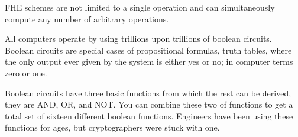 FHE schemes are not limited to a single operation and can simultaneously compute any number of arbitrary operations. 


All computers operate by using trillions upon trillions of boolean circuits. Boolean circuits are special cases of propositional formulas, truth tables, where the only output ever given by the system is either yes or no; in computer terms zero or one. 

Boolean circuits have three basic functions from which the rest can be derived, they are AND, OR, and NOT. You can combine these two of functions to get a total set of sixteen different boolean functions. Engineers have been using these functions for ages, but cryptographers were stuck with one. 



